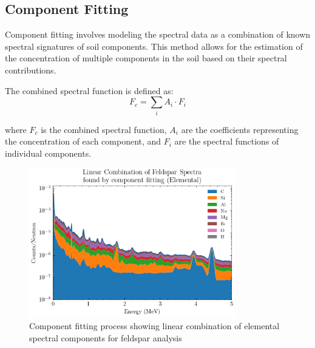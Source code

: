 \subsection{Component Fitting}

Component fitting involves modeling the spectral data as a combination of known spectral signatures of soil components. This method allows for the estimation of the concentration of multiple components in the soil based on their spectral contributions.

The combined spectral function is defined as:
\begin{equation}
F_c = \sum_{i} A_i \cdot F_i
\end{equation}

where $F_c$ is the combined spectral function, $A_i$ are the coefficients representing the concentration of each component, and $F_i$ are the spectral functions of individual components.


\begin{figure}[H]
\centering
\includegraphics[width=0.8\textwidth]{../Figures/Analysis/elemental_linear_combination_feldspar.png}
\caption{Component fitting process showing linear combination of elemental spectral components for feldspar analysis}
\label{fig:elemental_component_fitting}
\end{figure}

